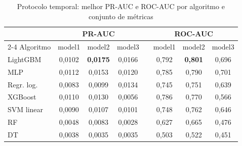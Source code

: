 \begin{table}[htbp]
    \centering
    \footnotesize
    \caption{Protocolo temporal: melhor PR-AUC e ROC-AUC por algoritmo e conjunto de métricas}
    \label{tab:res-grade}
    \begin{tabular}{lccccccc}
        \toprule
        & \multicolumn{3}{c}{PR-AUC} & & \multicolumn{3}{c}{ROC-AUC} \\
        \cmidrule{2-4} \cmidrule{6-8}
        Algoritmo & model1 & model2 & model3 & & model1 & model2 & model3 \\
        \midrule
        LightGBM   & 0,0102 & \textbf{0,0175} & 0,0166 & & 0,792 & \textbf{0,801} & 0,696 \\
        MLP        & 0,0112 & 0,0153 & 0,0120 & & 0,785 & 0,790 & 0,701 \\
        Regr. log. & 0,0083 & 0,0099 & 0,0134 & & 0,745 & 0,751 & 0,639 \\
        XGBoost    & 0,0110 & 0,0130 & 0,0056 & & 0,786 & 0,770 & 0,566 \\
        SVM linear & 0,0090 & 0,0107 & 0,0101 & & 0,748 & 0,762 & 0,646 \\
        RF         & 0,0048 & 0,0083 & 0,0028 & & 0,627 & 0,665 & 0,476 \\
        DT         & 0,0038 & 0,0035 & 0,0035 & & 0,503 & 0,522 & 0,451 \\
        \bottomrule
    \end{tabular}
\end{table}%

